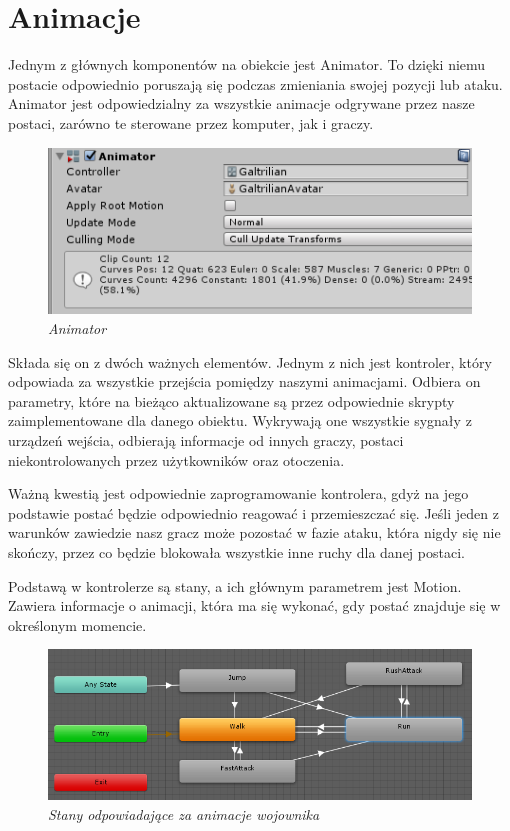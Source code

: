 \documentclass[openright]{xmgr}
\begin{document}
  \section{Animacje}

    Jednym z głównych komponentów na obiekcie jest Animator.
    To dzięki niemu postacie odpowiednio poruszają się podczas zmieniania swojej pozycji lub ataku.
    Animator jest odpowiedzialny za wszystkie animacje odgrywane przez nasze postaci, zarówno te sterowane przez komputer, jak i graczy.

        \begin{figure}[H]
        \center
        \includegraphics[width=12cm]{animator_4.png}
        \caption{ \textit{Animator}}
        \end{figure}

    Składa się on z dwóch ważnych elementów. Jednym z nich jest kontroler, który odpowiada za wszystkie przejścia pomiędzy naszymi animacjami. Odbiera on parametry, które na bieżąco aktualizowane są przez odpowiednie skrypty zaimplementowane dla danego obiektu. Wykrywają one wszystkie sygnały z urządzeń wejścia, odbierają informacje od innych graczy, postaci niekontrolowanych przez użytkowników oraz otoczenia.

    Ważną kwestią jest odpowiednie zaprogramowanie kontrolera, gdyż na jego podstawie postać będzie odpowiednio reagować i przemieszczać się. Jeśli jeden z warunków zawiedzie nasz gracz może pozostać w fazie ataku, która nigdy się nie skończy, przez co będzie blokowała wszystkie inne ruchy dla danej postaci.

    Podstawą w kontrolerze są stany, a ich głównym parametrem jest Motion. Zawiera informacje o animacji, która ma się wykonać, gdy postać znajduje się w określonym momencie.

    \begin{figure}[H]
        \center
        \includegraphics[width=\textwidth]{animator_5.png}
        \caption{ \textit{Stany odpowiadające za animacje wojownika}}
        \end{figure}
\end{document}
